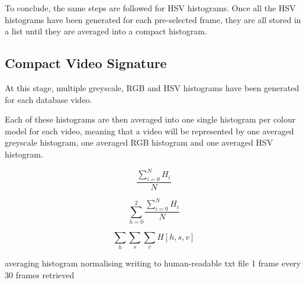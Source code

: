 To conclude, the same steps are followed for HSV histograms. Once all the HSV histograms have been generated for each pre-selected frame, they are all stored in a list until they are averaged into a compact histogram.



\subsection{Compact Video Signature}

At this stage, multiple greyscale, RGB and HSV histograms have been generated for each database video. 

Each of these histograms are then averaged into one single histogram per colour model for each video, meaning that a video will be represented by one averaged greyscale histogram, one averaged RGB histogram and one averaged HSV histogram.

\begin{equation}
\label{eq:average-greyscale-histogram}
    \frac{\sum_{i=0}^{N} H_i}{N}
\end{equation}

\begin{equation}
\label{eq:average-rgb-histogram}
    \sum_{h=0}^{2}\frac{\sum_{i=0}^{N} H_i}{N}
\end{equation}

\begin{equation}
\label{eq:average-hsv-histogram}
    \sum_h \sum_s \sum_v H[h,s,v]
\end{equation}

averaging histogram
normalising
writing to human-readable txt file
1 frame every 30 frames retrieved


